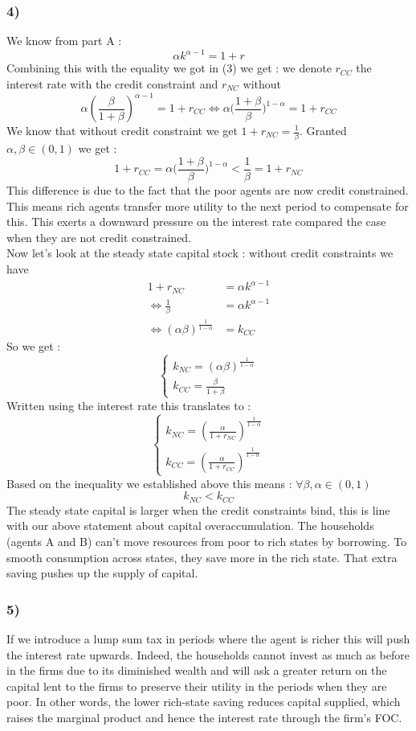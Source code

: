 \documentclass{article}
\begin{document}
\subsubsection{4)}
We know from part A : $$\alpha k^{\alpha-1}=1+r$$
Combining this with the equality we got in (3) we get : we denote $r_{CC}$ the interest rate with the credit constraint and $r_{NC}$ without 
$$\alpha(\frac{\beta}{1+\beta})^{\alpha-1}=1+r_{CC}\Leftrightarrow\alpha (\frac{1+\beta}\beta{)^{1-\alpha}=1+r_{CC}}$$
We know that without credit constraint we get $1+r_{NC}=\frac{1}{\beta}$. Granted $\alpha,\beta \in (0,1)$ we get : 
$$1+r_{CC}=\alpha (\frac{1+\beta}\beta{)^{1-\alpha}} < \frac{1}{\beta}=1+r_{NC}$$
This difference is due to the fact that the poor agents are now credit constrained. This means rich agents transfer more utility to the next period to compensate for this. This exerts a downward pressure on the interest rate compared the case when they are not credit constrained.  \\
Now let's look at the steady state capital stock : without credit constraints we have
$$\begin{aligned}
    1+r_{NC} &= \alpha k^{\alpha-1}\\
    \Leftrightarrow \frac{1}{\beta}&=\alpha k^{\alpha-1}\\
    \Leftrightarrow (\alpha\beta)^{\frac{1}{1-\alpha}}&=k_{CC}
\end{aligned}$$
So we get : 
$$\left\{\begin{aligned}
    k_{NC}=(\alpha\beta)^{\frac{1}{1-\alpha}}\\
    k_{CC} = \frac{\beta}{1+\beta}
\end{aligned}\right.$$
Written using the interest rate this translates to : 
$$\left\{\begin{aligned}
    k_{NC}=(\frac{\alpha}{1+r_{NC}})^{\frac{1}{1-\alpha}}\\
    k_{CC} =(\frac{\alpha}{1+r_{CC}})^{\frac{1}{1-\alpha}}
\end{aligned}\right.$$
Based on the inequality we established above this means : $\forall \beta,\alpha \in (0,1)$
$$k_{NC}<k_{CC}$$
The steady state capital is larger when the credit constraints bind, this is line with our above statement about capital overaccumulation. The households (agents A and B) can’t move resources from poor to rich states by borrowing. To smooth consumption across states, they save more in the rich state. That extra saving pushes up the supply of capital.

\subsubsection{5)}
If we introduce a lump sum tax in periods where the agent is richer this will push the interest rate upwards. Indeed, the households cannot invest as much as before in the firms due to its diminished wealth and will ask a greater return on the capital lent to the firms to preserve their utility in the periods when they are poor. In other words, the lower rich-state saving reduces capital supplied, which raises the marginal product and hence the interest rate through the firm’s FOC. 
\end{document}
